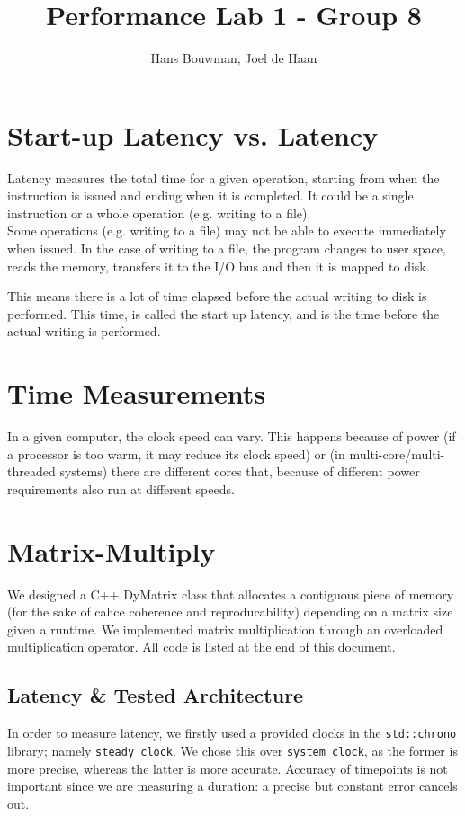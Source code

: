 \documentclass{article}
\title{Performance Lab 1 - Group 8}
\author{Hans Bouwman, Joel de Haan}
\begin{document}
\maketitle

\tableofcontents


\section{Start-up Latency vs. Latency}
Latency measures the total time for a given operation, starting from when the instruction is issued and ending when it is completed. It could be a single instruction or a whole operation (e.g. writing to a file).\\

Some operations (e.g. writing to a file) may not be able to execute immediately when issued. In the case of writing to a file, the program changes to user space, reads the memory, transfers it to the I/O bus and then it is mapped to disk.

This means there is a lot of time elapsed before the actual writing to disk is performed. This time, is called the start up latency, and is the time before the actual writing is performed.

\section{Time Measurements}
In a given computer, the clock speed can vary. This happens because of power (if a processor is too warm, it may reduce its clock speed) or (in multi-core/multi-threaded systems) there are different cores that, because of different power requirements also run at different speeds. 




\section{Matrix-Multiply}




We designed a C++ DyMatrix class that allocates a contiguous piece of memory (for the sake of cahce coherence and reproducability) depending on a matrix size given a runtime. We implemented matrix multiplication through an overloaded multiplication operator. All code is listed at the end of this document.

\subsection{Latency \& Tested Architecture}
In order to measure latency, we firstly used a provided clocks in the \texttt{std::chrono} library; namely \texttt{steady\_clock}. 
We chose this over \texttt{system\_clock}, as the former is more precise, whereas the latter is more accurate. Accuracy of timepoints is not important since we are measuring a duration: a precise but constant error cancels out.
\end{document}
